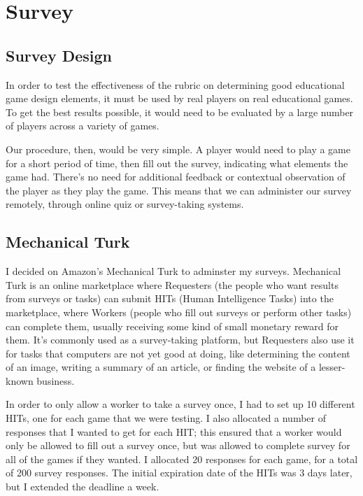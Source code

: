 \cleardoublepage
\section{Survey}
	\subsection{Survey Design}
		In order to test the effectiveness of the rubric on determining good educational game design elements, it must be used by real players on real educational games. To get the best results possible, it would need to be evaluated by a large number of players across a variety of games.

		Our procedure, then, would be very simple. A player would need to play a game for a short period of time, then fill out the survey, indicating what elements the game had. There's no need for additional feedback or contextual observation of the player as they play the game. This means that we can administer our survey remotely, through online quiz or survey-taking systems.

	\subsection{Mechanical Turk}
		I decided on Amazon's Mechanical Turk to adminster my surveys. Mechanical Turk is an online marketplace where Requesters (the people who want results from surveys or tasks) can submit HITs (Human Intelligence Tasks) into the marketplace, where Workers (people who fill out surveys or perform other tasks) can complete them, usually receiving some kind of small monetary reward for them. It's commonly used as a survey-taking platform, but Requesters also use it for tasks that computers are not yet good at doing, like determining the content of an image, writing a summary of an article, or finding the website of a lesser-known business.


		In order to only allow a worker to take a survey once, I had to set up 10 different HITs, one for each game that we were testing. I also allocated a number of responses that I wanted to get for each HIT; this ensured that a worker would only be allowed to fill out a survey once, but was allowed to complete survey for all of the games if they wanted. I allocated 20 responses for each game, for a total of 200 survey responses. The initial expiration date of the HITs was 3 days later, but I extended the deadline a week. 

